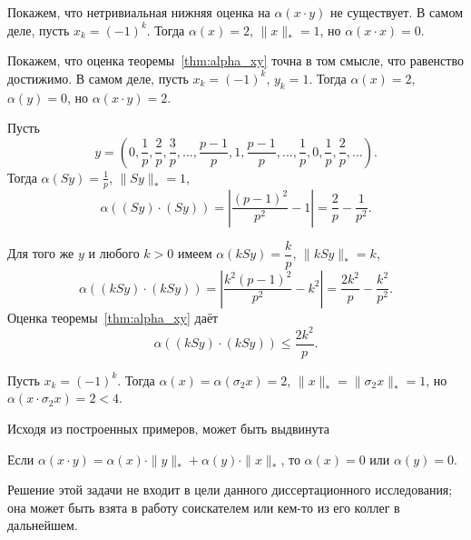 \begin{example}
	Покажем, что нетривиальная нижняя оценка на $\alpha(x\cdot y)$ не существует.
	В самом деле,
	пусть $x_k = (-1)^k$.
	Тогда $\alpha(x) = 2$, $\|x\|_* = 1$,
	но $\alpha(x\cdot x) = 0$.
\end{example}

\begin{example}
	\label{ex:alpha-c_not_ideal}
	Покажем, что оценка теоремы~\ref{thm:alpha_xy} точна в том смысле,
	что равенство достижимо.
	В самом деле,
	пусть $x_k = (-1)^k$, $y_k = 1$.
	Тогда $\alpha(x) = 2$, $\alpha(y) = 0$,
	но $\alpha(x\cdot y) = 2$.
\end{example}

\begin{example}
	Пусть
	\begin{equation}
		y = \left(
			0, \frac{1}{p}, \frac{2}{p}, \frac{3}{p},
			...,
			\frac{p-1}{p}, 1, \frac{p-1}{p},
			...,
			\frac{1}{p},
			0,
			\frac{1}{p}, \frac{2}{p}, ...
		\right)
		.
	\end{equation}
	Тогда $\alpha(Sy) = \frac{1}{p}$, $\|Sy\|_* = 1$,
	\begin{equation}
		\alpha((Sy)\cdot(Sy)) =
		\left| \frac{(p-1)^2}{p^2} - 1 \right| =
		\frac{2}{p}-\frac{1}{p^2}
		.
	\end{equation}
\end{example}

\begin{example}
	Для того же $y$ и любого $k>0$ имеем
	$\alpha(kSy) = \dfrac{k}{p}$, $\|kSy\|_* = k$,
	\begin{equation}
		\alpha((kSy)\cdot(kSy)) =
		\left| \frac{k^2(p-1)^2}{p^2} - k^2 \right| =
		\frac{2k^2}{p}-\frac{k^2}{p^2}
		.
	\end{equation}
	Оценка теоремы~\ref{thm:alpha_xy} даёт
	\begin{equation}
		\alpha((kSy)\cdot(kSy)) \leq
		\frac{2k^2}{p}
		.
	\end{equation}
\end{example}



\begin{example}
	Пусть $x_k = (-1)^k$.
	Тогда $\alpha(x) = \alpha(\sigma_2 x) = 2$, $\|x\|_* = \|\sigma_2 x\|_* = 1$,
	но $\alpha(x\cdot \sigma_2 x) = 2 < 4$.
\end{example}

Исходя из построенных примеров, может быть выдвинута
\begin{hypothesis}
	Если $\alpha(x\cdot y)= \alpha(x)\cdot \|y\|_* + \alpha(y)\cdot \|x\|_*$,
	то $\alpha(x) = 0$ или $\alpha(y) = 0$.
\end{hypothesis}

Решение этой задачи не входит в цели данного диссертационного исследования;
она может быть взята в работу соискателем или кем-то из его коллег в дальнейшем.
